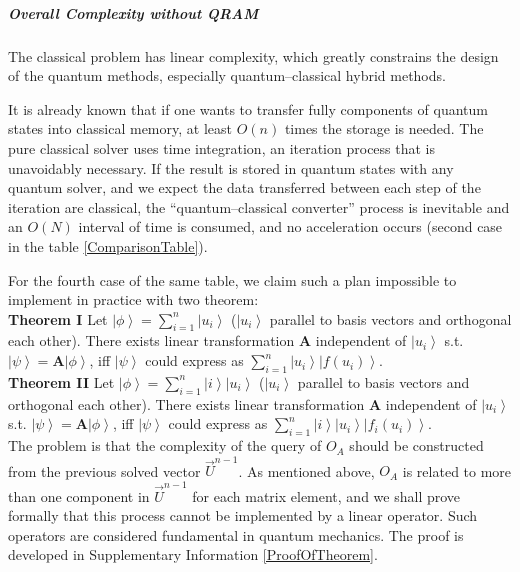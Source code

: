 \documentclass[%
 reprint,
 amsmath,amssymb,
pra,
]{revtex4-1}
\begin{document}
\subparagraph{Overall Complexity without QRAM} The classical problem has linear complexity, which greatly constrains the design of the quantum methods, especially quantum--classical hybrid methods. 

It is already known that if one wants to transfer fully components of quantum states into classical memory, at least $O(n)$ times the storage is needed. The pure classical solver uses time integration, an iteration process that is unavoidably necessary. If the result is stored in quantum states with any quantum solver, and we expect the data transferred between each step of the iteration are classical, the ``quantum--classical converter'' process is inevitable and an $O(N)$ interval of time is consumed, and no acceleration occurs (second case in the table \ref{ComparisonTable}).

For the fourth case of the same table, we claim such a plan impossible to implement in practice with two theorem:
~\\

\textbf{Theorem I} Let $\left|\phi\right\rangle = \sum_{i=1}^n \left|u_i\right\rangle$ ($\left|u_i\right\rangle$ parallel to basis vectors and orthogonal each other). There exists 
linear transformation $\bm{A}$ independent of $\left|u_{i}\right\rangle$ s.t. $\left|\psi\right\rangle = \bm{A}\left|\phi\right\rangle$, iff $\left|\psi\right\rangle$ could express as $\sum_{i=1}^{n}\left|u_i\right\rangle\left|f\left(u_i\right)\right\rangle$.
~\\

\textbf{Theorem II} Let $\left|\phi\right\rangle = \sum_{i=1}^n \left|i\right\rangle\left|u_i\right\rangle$ ($\left|u_i\right\rangle$ parallel to basis vectors and orthogonal each other). There exists 
linear transformation $\bm{A}$ independent of $\left|u_{i}\right\rangle$ s.t. $\left|\psi\right\rangle = \bm{A}\left|\phi\right\rangle$, iff $\left|\psi\right\rangle$ could express as $\sum_{i=1}^n \left|i\right\rangle\left|u_i\right\rangle\left|f_{i}\left(u_i\right)\right\rangle$.
~\\

The problem is that the complexity of the query of $O_A$ should be constructed from the previous solved vector $\vec{U}^{n-1}$. As mentioned above, $O_A$ is related to more than one component in $\vec{U}^{n-1}$ for each matrix element, and we shall prove formally that this process cannot be implemented by a linear operator. Such operators are considered fundamental in quantum mechanics. The proof is developed in Supplementary Information \ref{ProofOfTheorem}.
\end{document}
